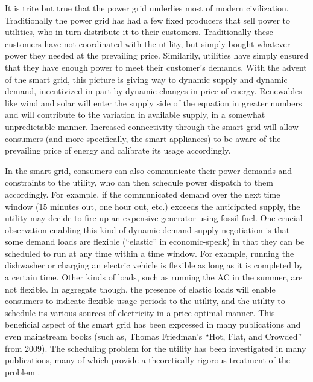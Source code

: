 \documentclass[conference]{IEEEtran}
\begin{document}
It is trite but true that the power grid underlies most of modern civilization.  Traditionally the power grid has had a 
few fixed producers that sell power to utilities, who in turn distribute it to their customers.  Traditionally these 
customers have not coordinated with the utility, but simply bought whatever power they needed at the prevailing price.  
Similarily, utilities have simply ensured that they have enough power to meet their customer's demands.  
With the advent of the smart grid, this picture is giving way to dynamic supply and dynamic demand, incentivized in part by dynamic changes in price of energy.  Renewables like wind and solar will enter the supply side of the equation in greater numbers and will contribute to the variation in available supply, in a somewhat unpredictable manner. Increased connectivity through the smart grid will allow consumers (and more specifically, the smart appliances) to be 
aware of the prevailing price of energy and calibrate its usage accordingly. 

In the smart grid, consumers can also communicate their power demands and constraints to the utility, who can then schedule
power dispatch to them accordingly.  For example, if the communicated demand over the next time window (15 minutes out, one hour out, etc.) exceeds the anticipated supply, the utility may decide to fire up an expensive generator using fossil fuel. One crucial observation enabling this kind of dynamic demand-supply negotiation is that some demand loads are flexible (``elastic'' in economic-speak) in that they can be scheduled to run at any time within a time window. For example, running the dishwasher or charging an electric vehicle is flexible as long as it is completed by a certain time. Other kinds of loads, such as running the AC in the summer, are not flexible. In aggregate though, the presence of elastic loads will enable consumers to indicate flexible usage periods to the utility, and the utility to schedule its various sources of electricity in a price-optimal manner. This beneficial aspect of the smart grid has been expressed in many publications and even mainstream books (such as, Thomas Friedman's ``Hot, Flat, and Crowded'' from 2009). The scheduling problem for the utility has been investigated in many publications, many of which provide a theoretically rigorous treatment of the problem \cite{petersen2013taxonomy}. 
\end{document}
